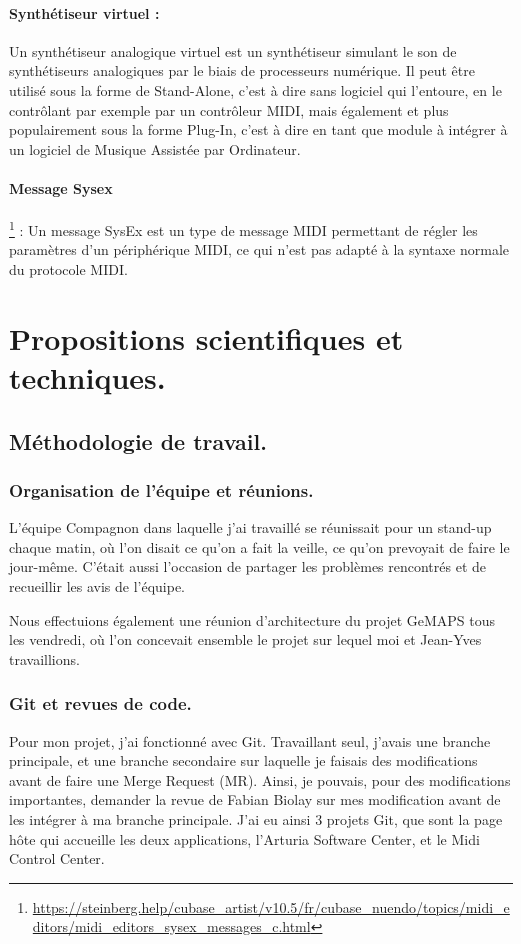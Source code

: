 \documentclass[francais]{rapportPFE}  %
\begin{document}
\paragraph{Synthétiseur virtuel :} Un synthétiseur analogique virtuel est un synthétiseur simulant le son de synthétiseurs analogiques par le biais de processeurs numérique. Il peut être utilisé sous la forme de Stand-Alone, c'est à dire sans logiciel qui l'entoure, en le contrôlant par exemple par un contrôleur MIDI, mais également et plus populairement sous la forme Plug-In, c'est à dire en tant que module à intégrer à un logiciel de Musique Assistée par Ordinateur.
\paragraph{Message Sysex}
\footnote{\url{https://steinberg.help/cubase_artist/v10.5/fr/cubase_nuendo/topics/midi_editors/midi_editors_sysex_messages_c.html}}
: Un message SysEx est un type de message MIDI permettant de régler les paramètres d'un périphérique MIDI, ce qui n'est pas adapté à la syntaxe normale du protocole MIDI.


\section{Propositions scientifiques et techniques.}
\subsection{Méthodologie de travail.}
\subsubsection{Organisation de l'équipe et réunions.}
L'équipe Compagnon dans laquelle j'ai travaillé se réunissait pour un stand-up chaque matin, où l'on disait ce qu'on a fait la veille, ce qu'on prevoyait de faire le jour-même. C'était aussi l'occasion de partager les problèmes rencontrés et de recueillir les avis de l'équipe.

Nous effectuions également une réunion d'architecture du projet GeMAPS tous les vendredi, où l'on concevait ensemble le projet sur lequel moi et Jean-Yves travaillions. 


\subsubsection{Git et revues de code.}
Pour mon projet, j'ai fonctionné avec Git. Travaillant seul, j'avais une branche principale, et une branche secondaire sur laquelle je faisais des modifications avant de faire une Merge Request (MR). Ainsi, je pouvais, pour des modifications importantes, demander la revue de Fabian Biolay sur mes modification avant de les intégrer à ma branche principale. J'ai eu ainsi 3 projets Git, que sont la page hôte qui accueille les deux applications, l'Arturia Software Center, et le Midi Control Center.
\end{document}
